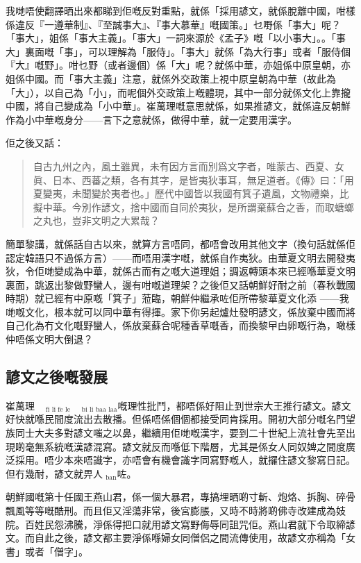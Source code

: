 \documentclass[a5paper, 12pt, openany]{book} %
\begin{document}
我哋唔使翻譯晒出來都睇到佢嘅反對重點，就係「採用諺文，就係脫離中國，咁樣係違反『一遵華制』、『至誠事大』、『事大慕華』嘅國策。」乜嘢係「事大」呢？「事大」，姐係「事大主義」。「事大」一詞來源於《孟子》嘅「以小事大」。。「事大」裏面嘅「事」，可以理解為「服侍」。「事大」就係「為大行事」或者「服侍個『大』嘅野」。咁乜野（或者邊個）係「大」呢？就係中華，亦姐係中原皇朝，亦姐係中國。而「事大主義」注意，就係外交政策上視中原皇朝為中華（故此為「大」），以自己為「小」，而呢個外交政策上嘅體現，其中一部分就係文化上靠攏中國，將自己變成為「小中華」。崔萬理嘅意思就係，如果推諺文，就係違反朝鮮作為小中華嘅身分——言下之意就係，做得中華，就一定要用漢字。

佢之後又話：

\begin{quotation}
	自古九州之內，風土雖異，未有因方言而別爲文字者，唯蒙古、西夏、女眞、日本、西蕃之類，各有其字，是皆夷狄事耳，無足道者。《傳》曰：「用夏變夷，未聞變於夷者也。」歷代中國皆以我國有箕子遺風，文物禮樂，比擬中華。今別作諺文，捨中國而自同於夷狄，是所謂棄蘇合之香，而取螗螂之丸也，豈非文明之大累哉？	
\end{quotation}

簡單黎講，就係話自古以來，就算方言唔同，都唔會改用其他文字（換句話就係佢認定韓語只不過係方言）——而唔用漢字嘅，就係自作夷狄。由華夏文明去開發夷狄，令佢哋變成為中華，就係古而有之嘅大道理姐；調返轉頭本來已經喺華夏文明裏面，跳返出黎做野蠻人，邊有咁嘅道理架？之後佢又話朝鮮好耐之前（春秋戰國時期）就已經有中原嘅「箕子」蒞臨，朝鮮仲繼承咗佢所帶黎華夏文化添
——我哋嘅文化，根本就可以同中華有得揮。家下你另起爐灶發明諺文，係放棄中國而將自己化為冇文化嘅野蠻人，係放棄蘇合呢種香草嘅香，而換黎曱甴卵嘅行為，噉樣仲唔係文明大倒退？

\subsection*{諺文之後嘅發展}

崔萬理$_{\text{fi li fe le}}$$_{\text{bi li baa laa}}$嘅理性批鬥，都唔係好阻止到世宗大王推行諺文。諺文好快就喺民間度流出去散播。但係唔係個個都接受同肯採用。開初大部分嘅名門望族同士大夫多對諺文嗤之以鼻，繼續用佢哋嘅漢字，要到二十世紀上流社會先至出現啲毫無系統嘅漢諺混寫。諺文就反而喺低下階層，尤其是係女人同奴婢之間度廣泛採用。唔少本來唔識字，亦唔會有機會識字同寫野嘅人，就攞住諺文黎寫日記。
但冇幾耐，諺文就畀人$_{\text{ban}}$咗。

朝鮮國嘅第十任國王燕山君，係一個大暴君，專搞埋晒啲寸斬、炮烙、拆胸、碎骨飄風等等嘅酷刑。而且佢又淫蕩非常，後宮膨脹，又時不時將啲佛寺改建成為妓院。百姓民怨沸騰，淨係得把口就用諺文寫野侮辱同詛咒佢。燕山君就下令取締諺文。而自此之後，諺文都主要淨係喺婦女同僧侶之間流傳使用，故諺文亦稱為「女書」或者「僧字」。
\end{document}
